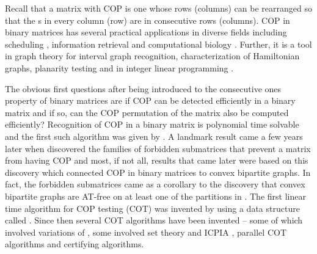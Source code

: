 

Recall that a matrix with COP is one whose rows (columns) can be
rearranged so that the {\un}s in every column (row) are in consecutive
rows (columns). %
COP in binary matrices has several practical applications
in diverse fields including scheduling \cite{hl06}, information
retrieval \cite{k77} and computational biology \cite{abh98}.  Further,
it is a tool in graph theory \cite{mcg04} for interval graph
recognition, characterization of Hamiltonian graphs, planarity testing
\cite{bl76} and in integer linear programming \cite{ht02,hl06}.


The obvious first questions after being introduced to the consecutive
ones property of binary matrices are if COP can be detected
efficiently in a binary matrix and if so, can the COP permutation of
the matrix also be computed efficiently?  Recognition of COP in a
binary matrix is polynomial time solvable and the first such algorithm
was given by \cite{fg65}.  A landmark result came a few years later
when \cite{at72} discovered the families of forbidden submatrices that
prevent a matrix from having COP and most, if not all, results that
came later were based on this discovery which connected COP in binary
matrices to convex bipartite graphs. In fact, the forbidden
submatrices came as a corollary to the discovery that convex bipartite
graphs are AT-free on at least one of the partitions in
\cite{at72}. The first linear time algorithm for COP testing (COT) was
invented by \cite{bl76} using a data structure called \PQtrees.  Since
then several COT algorithms have been invented -- some of which
involved variations of \PQtrees \cite{mm96,wlh01,mcc04}, some involved
set theory and ICPIA \cite{wlh02,nsnrs09}, parallel COT
algorithms\cite{as95,bs03,ly91} and certifying algorithms\cite{mcc04}.

